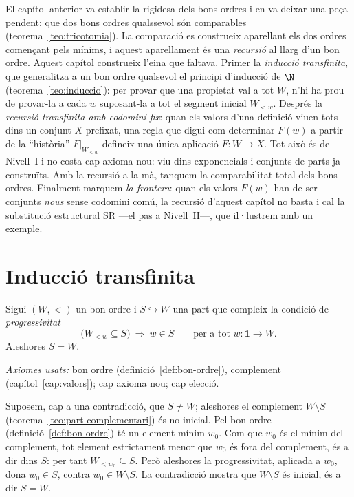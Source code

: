 El capítol anterior va establir la rigidesa dels bons ordres i en va deixar
una peça pendent: que dos bons ordres qualssevol són comparables
(teorema~\ref{teo:tricotomia}). La comparació es construeix aparellant els
dos ordres començant pels mínims, i aquest aparellament és una \emph{recursió}
al llarg d'un bon ordre. Aquest capítol construeix l'eina que faltava. Primer
la \emph{inducció transfinita}, que generalitza a un bon ordre qualsevol el
principi d'inducció de \(\N\) (teorema~\ref{teo:induccio}): per provar que una
propietat val a tot \(W\), n'hi ha prou de provar-la a cada \(w\) suposant-la
a tot el segment inicial \(W_{<w}\). Després la \emph{recursió transfinita amb
codomini fix}: quan els valors d'una definició viuen tots dins un conjunt
\(X\) prefixat, una regla que digui com determinar \(F(w)\) a partir de la
\enquote{història} \(F|_{W_{<w}}\) defineix una única aplicació \(F\colon W\to
X\). Tot això és de Nivell~I i no costa cap axioma nou: viu dins exponencials
i conjunts de parts ja construïts. Amb la recursió a la mà, tanquem la
comparabilitat total dels bons ordres. Finalment marquem \emph{la frontera}:
quan els valors \(F(w)\) han de ser conjunts \emph{nous} sense codomini comú,
la recursió d'aquest capítol no basta i cal la substitució estructural SR
---el pas a Nivell~II---, que il·lustrem amb un exemple.

\section{Inducció transfinita}\label{sec:induccio-transfinita}

\begin{teorema}\label{teo:induccio-transfinita}
Sigui \((W,<)\) un bon ordre i \(S\hookrightarrow W\) una part que compleix
la condició de \emph{progressivitat}
\[
\bigl(W_{<w}\subseteq S\bigr)\ \Longrightarrow\ w\in S
\qquad\text{per a tot } w\colon\mathbf1\to W .
\]
Aleshores \(S=W\).\par
\emph{Axiomes usats:} bon ordre (definició~\ref{def:bon-ordre}), complement
(capítol~\ref{cap:valors}); cap axioma nou; cap elecció.
\end{teorema}

\begin{prova}
Suposem, cap a una contradicció, que \(S\neq W\); aleshores el complement
\(W\setminus S\) (teorema~\ref{teo:part-complementari}) és no inicial. Pel bon
ordre (definició~\ref{def:bon-ordre}) té un element mínim \(w_0\). Com que
\(w_0\) és el mínim del complement, tot element estrictament menor que \(w_0\)
és fora del complement, és a dir dins \(S\): per tant \(W_{<w_0}\subseteq S\).
Però aleshores la progressivitat, aplicada a \(w_0\), dona \(w_0\in S\),
contra \(w_0\in W\setminus S\). La contradicció mostra que \(W\setminus S\) és
inicial, és a dir \(S=W\).
\end{prova}

